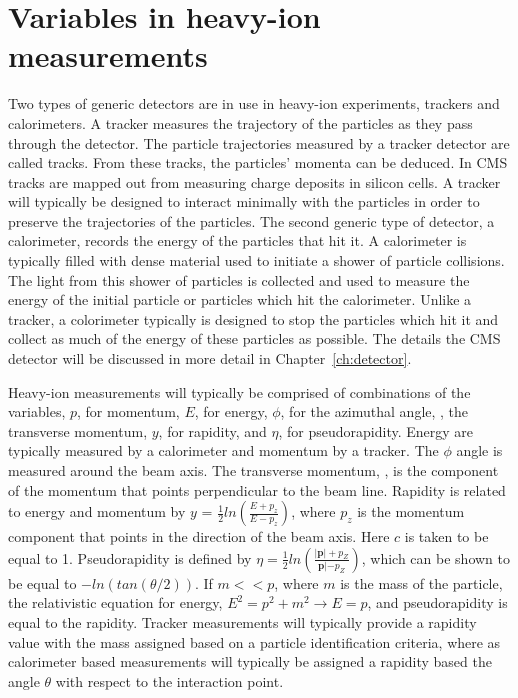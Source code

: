   \section{Variables in heavy-ion measurements}
    \DIFdelbegin {}\DIFdelend Two types of generic detectors are in use in heavy-ion experiments, 
      trackers and calorimeters. 
    A tracker measures the trajectory of the particles as they pass through 
      the detector.
    The particle trajectories measured by a tracker detector are called 
      tracks.
    From these tracks, the particles' momenta can be deduced. 
    In CMS tracks are mapped out from measuring charge deposits \DIFdelbegin {}\DIFdelend in silicon
      cells.
    A tracker will typically be designed to interact minimally with the 
      particles in order to preserve the trajectories of the particles. 
    The second generic type of detector, a calorimeter, records the energy 
      of the particles that hit it. 
    A calorimeter is typically filled with dense material used to initiate a 
      shower of particle collisions.
    The light from this shower of particles is collected and used to measure 
      the energy of the initial particle or particles which hit the 
      calorimeter.
    Unlike a tracker, a colorimeter typically is designed to stop the particles
      which hit it and collect as much of the energy of these particles as 
      possible.
    The details the CMS detector will be discussed in more detail in 
     Chapter~\ref{ch:detector}.

    Heavy-ion measurements will typically be comprised of 
      combinations of the variables, $p$, for momentum, $E$, for energy, 
      $\phi$, for the azimuthal angle, \pt, the transverse momentum, $y$, 
      for rapidity, and $\eta$, for pseudorapidity. 
    Energy are typically measured by a calorimeter and momentum by a tracker.
    The $\phi$ angle is measured around the beam axis. 
    The transverse momentum, \pt, is the component of the momentum that points
      perpendicular to the beam line. 
    Rapidity is related to energy and momentum by 
    $y$ = $\frac{1}{2}ln\left(\frac{E+p_{z}}{E-p_{z}}\right)$, where $p_{z}$ 
      is the momentum component that points in the direction of the beam axis. 
    Here $c$ is taken to be equal to 1. 
    Pseudorapidity is defined by
      $\eta=\frac{1}{2}ln\left(\frac{|\mathbf{p}|+p_{Z}}{\mathbf{p}|-p_{Z}}\right)$, 
      which can be shown to be equal to $-ln\left(tan\left(\theta/2\right)\right)$.
    If $m << p$, where $m$ is the mass of the particle, the 
      relativistic equation for energy, $E^2=p^2+m^2 \rightarrow E=p$, and 
      pseudorapidity is equal to the rapidity. 
    Tracker measurements will typically provide a rapidity value with 
      the mass assigned based on a particle identification criteria, where as 
      calorimeter based measurements will typically be assigned a rapidity 
      based \DIFaddbegin {}\DIFaddend the angle $\theta$ with respect to the interaction point.

